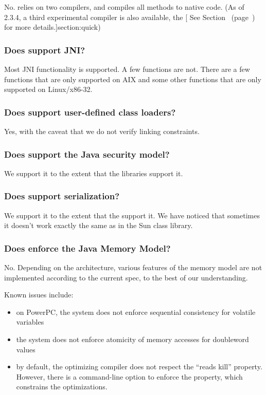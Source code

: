 No.  \jrvm{} relies on two compilers, and compiles all methods to
native code.  (As of \jrvm{} 2.3.4, a third experimental compiler is
also available, the [ See
Section~\Ref{} (page~\Pageref) for more details.]{section:quick})

\subsubsection{Does \jrvm{} support JNI?}

Most JNI functionality is supported. A few functions are not. 
There are a few functions that are only supported on AIX\TMweb{}
and some other functions that are only supported on Linux\Rweb{}/x86-32.

\subsubsection{Does \jrvm{} support user-defined class loaders?}
Yes, with the caveat that we do not verify linking constraints.

\subsubsection{Does \jrvm{} support the Java\TMheadingweb{} security model?} 

We support it to the extent that the 
libraries support it.

\subsubsection{Does \jrvm{} support serialization?}

We support it to the extent that the 
support it. We have noticed that sometimes it doesn't
work exactly the same as in the Sun\Rweb{} class library.

\subsubsection{Does \jrvm{} enforce the Java Memory Model?}

No. Depending on the architecture, various features of the memory model
are not implemented according to the current spec, to the best of our
understanding.

Known issues include:
\begin{itemize}
\item on PowerPC\TMweb{}, the system does not enforce
sequential consistency for volatile variables
\item the system does not enforce atomicity of memory accesses for
doubleword values
\item by default, the optimizing compiler does not respect the ``reads
kill'' property.  However, there is a command-line option to enforce the
property, which constrains the optimizations.
\end{itemize}

